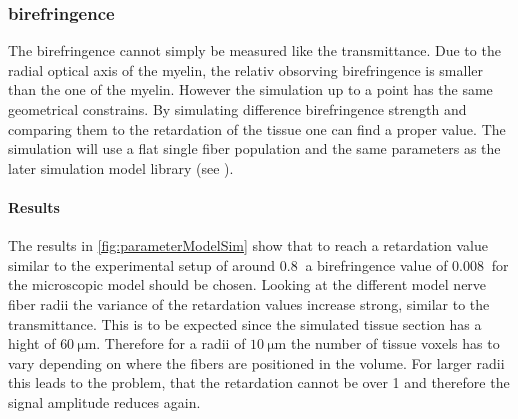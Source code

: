 \subsubsection{birefringence}
% 
The birefringence cannot simply be measured like the transmittance.
Due to the radial optical axis of the myelin, the relativ obsorving birefringence is smaller than the one of the myelin.
However the simulation up to a point has the same geometrical constrains.
By simulating difference birefringence strength and comparing them to the retardation of the tissue one can find a proper value.
The simulation will use a flat single fiber population and the same parameters as the later simulation model library (see \dummy{}).
% 
\paragraph{Results}
The results in \cref{fig:parameterModelSim} show that to reach a retardation value similar to the experimental setup of around $\SI{0.8}{}$ a birefringence value of $\SI{0.008}{}$ for the microscopic model should be chosen.
Looking at the different model nerve fiber radii the variance of the retardation values increase strong, similar to the transmittance.
This is to be expected since the simulated tissue section has a hight of $\SI{60}{\micro\meter}$.
Therefore for a radii of $\SI{10}{\micro\meter}$ the number of tissue voxels has to vary depending on where the fibers are positioned in the volume.
For larger radii this leads to the problem, that the retardation cannot be over 1 and therefore the signal amplitude reduces again.
% 
% 
% 
% 
% 

